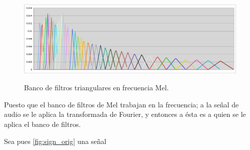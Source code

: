 \begin{figure}[bth]
  \myfloatalign
  {\includegraphics[width=0.9\linewidth]{gfx/chap5/melfb}} \quad
  \caption{Banco de filtros triangulares en frecuencia Mel.}
  \label{fig:sign_melfb}
\end{figure}

Puesto que el banco de filtros de Mel trabajan en la frecuencia; a la señal de audio se le aplica la transformada de Fourier, y entonces a ésta es a quien se le aplica el banco de filtros.

Sea pues \autoref{fig:sign_orig} una señal 
